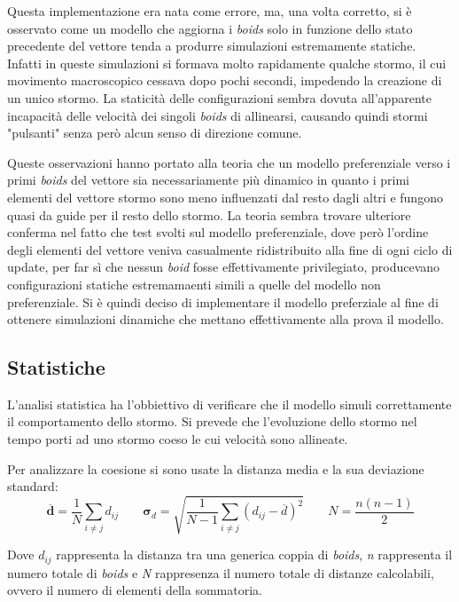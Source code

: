 \documentclass{article}
\begin{document}
Questa implementazione era nata come errore, ma, una volta corretto, si è 
osservato come un modello che aggiorna i \textit{boids} solo in funzione dello 
stato precedente del vettore tenda a produrre simulazioni estremamente statiche.
 Infatti in queste simulazioni si formava molto rapidamente qualche stormo, il 
 cui movimento macroscopico cessava dopo pochi secondi, impedendo la creazione 
 di un unico stormo. La staticità delle configurazioni sembra dovuta 
 all'apparente incapacità delle velocità dei singoli \textit{boids} di 
 allinearsi, causando quindi stormi "pulsanti" senza però alcun senso di 
 direzione comune. 

Queste osservazioni hanno portato alla teoria che un modello preferenziale verso
 i primi \textit{boids} del vettore sia necessariamente più dinamico in quanto i
  primi elementi del vettore stormo sono meno influenzati dal resto dagli altri 
  e fungono quasi da guide per il resto dello stormo. La teoria sembra trovare 
  ulteriore conferma nel fatto che test svolti sul modello preferenziale, dove 
  però l'ordine degli elementi del vettore veniva casualmente ridistribuito alla
   fine di ogni ciclo di update, per far sì che nessun \textit{boid} fosse 
   effettivamente privilegiato, producevano configurazioni statiche  
   estremamaenti simili a quelle del modello non preferenziale. 
Si è quindi deciso di implementare il modello preferziale al fine di ottenere 
simulazioni dinamiche che mettano effettivamente alla prova il modello.


\subsection{Statistiche}

L'analisi statistica ha l'obbiettivo di verificare che il modello simuli 
correttamente il comportamento dello stormo. Si prevede che l'evoluzione dello 
stormo nel tempo porti ad uno stormo coeso le cui velocità sono allineate. 

Per analizzare la coesione si sono usate la distanza media e la sua deviazione 
standard: 
\bigskip
\[
\mathbf{\overline{d}} = \frac{1}{N}\sum_{ i \neq j}^{} d_{ij} \;\;\;\;\;\;\;
\mathbf{\sigma}_d = \sqrt{\frac{1}{N-1}\sum_{i \neq j} (d_{ij} - 
\overline{d})^2}
\;\;\;\;\;\;\;N=\frac{n(n-1)}{2}
\] \medskip

Dove $d_{ij}$ rappresenta la distanza tra una generica coppia di \textit{boids},
 \textit{n} rappresenta il numero totale di \textit{boids} e \textit{N} 
 rappresenza il numero totale di distanze calcolabili, ovvero il numero di 
 elementi della sommatoria.
\end{document}
